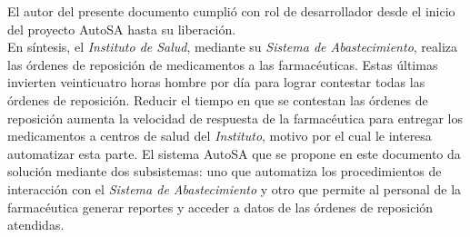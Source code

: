 El autor del presente documento cumplió con rol de desarrollador desde el inicio del proyecto AutoSA hasta su liberación.\\
En síntesis, el \textit{Instituto de Salud}, mediante su \textit{Sistema de Abastecimiento}, realiza las órdenes de reposición de medicamentos a las farmacéuticas. Estas últimas invierten veinticuatro horas hombre por día para lograr contestar todas las órdenes de reposición. Reducir el tiempo en que se contestan las órdenes de reposición aumenta la velocidad de respuesta de la farmacéutica para entregar los medicamentos a centros de salud del \textit{Instituto}, motivo por el cual le interesa automatizar esta parte. El sistema AutoSA que se propone en este documento da solución mediante dos subsistemas: uno que automatiza los procedimientos de interacción con el \textit{Sistema de Abastecimiento} y otro que permite al personal de la farmacéutica generar reportes y acceder a datos de las órdenes de reposición atendidas.
